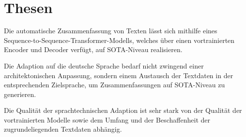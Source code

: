 \chapter*{Thesen}
\thispagestyle{empty}

\noindent
Die automatische Zusammenfassung von Texten lässt sich mithilfe eines Sequence-to-Sequence-Transformer-Modells, welches über einen vortrainierten Encoder und Decoder verfügt, auf SOTA-Niveau realisieren.\\
\newline

\noindent
Die Adaption auf die deutsche Sprache bedarf nicht zwingend einer architektonischen Anpassung, sondern einem Austausch der Textdaten in der entsprechenden Zielsprache, um Zusammenfassungen auf SOTA-Niveau zu generieren.\\
\newline

\noindent
Die Qualität der sprachtechnischen Adaption ist sehr stark von der Qualität der vortrainierten Modelle sowie dem Umfang und der Beschaffenheit der zugrundeliegenden Textdaten abhängig.
